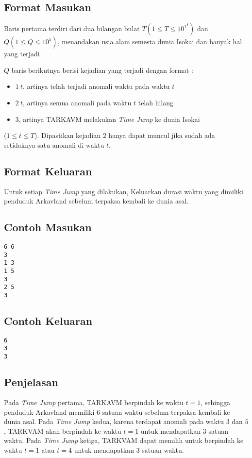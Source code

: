 \documentclass{article}
\begin{document}
\subsection*{Format Masukan}

Baris pertama terdiri dari dua bilangan bulat $T (1 \leq T \leq 10^1^8)$ dan $Q (1 \leq Q \leq 10^5)$, menandakan usia alam semesta dunia Isokai dan banyak hal yang terjadi

$Q$ baris berikutnya berisi kejadian yang terjadi dengan format :
\begin{itemize}
    \setlength\itemsep{0pt}
	\item$1\:t$, artinya telah terjadi anomali waktu pada waktu $t$
	\item$2\:t$, artinya semua anomali pada waktu $t$ telah hilang
	\item$3$, artinya TARKAVM melakukan \textit{Time Jump} ke dunia Isokai
\end{itemize}
($1 \leq t \leq T$). Dipastikan kejadian $2$ hanya dapat muncul jika sudah ada setidaknya satu anomali di waktu $t$.

\subsection*{Format Keluaran}

Untuk setiap \textit{Time Jump} yang dilakukan, Keluarkan durasi waktu yang dimiliki penduduk Arkavland sebelum terpaksa kembali ke dunia asal.
\\

\begin{multicols}{2}
\subsection*{Contoh Masukan}
\begin{lstlisting}
6 6
3
1 3
1 5
3
2 5
3

\end{lstlisting}
\columnbreak
\subsection*{Contoh Keluaran}
\begin{lstlisting}
6
3
3
\end{lstlisting}
\vfill
\null
\end{multicols}

\subsection*{Penjelasan}
Pada \textit{Time Jump} pertama, TARKAVM berpindah ke waktu $t = 1$, sehingga penduduk Arkavland memiliki 6 satuan waktu sebelum terpaksa kembali ke dunia asal. Pada \textit{Time Jump} kedua, karena terdapat anomali pada waktu $3$ dan $5$, TARKVAM akan berpindah ke waktu $t = 1$ untuk mendapatkan $3$ satuan waktu. Pada \textit{Time Jump} ketiga, TARKVAM dapat memilih untuk berpindah ke waktu $t = 1$ atau $t = 4$ untuk mendapatkan $3$ satuan waktu.

\pagebreak
\end{document}
